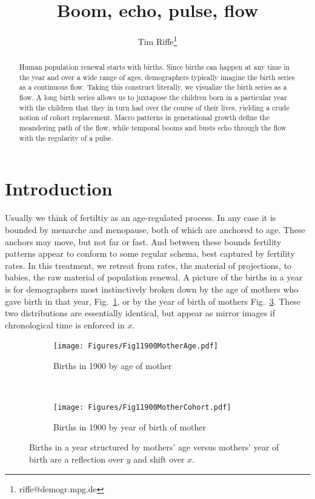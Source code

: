 \documentclass{article}
\begin{document}
\title{Boom, echo, pulse, flow}
\author[1]{Tim Riffe\thanks{riffe@demogr.mpg.de}}
\maketitle

\begin{abstract}
Human population renewal starts with births. Since births can happen at any
time in the year and over a wide range of ages, demographers typically imagine
the birth series as a continuous flow. Taking this construct literally, we
visualize the birth series as a flow. A long birth series allows us to
juxtapose the children born in a particular year with the children that
they in turn had over the course of their lives, yielding a crude notion of
cohort replacement. Macro patterns in generational growth define the meandering
path of the flow, while temporal booms and busts echo through the flow with the
regularity of a pulse.
\end{abstract}

\onehalfspacing
\section{Introduction}
Usually we think of fertiltiy as an age-regulated process. In any case it is
bounded by menarche and menopause, both of which are anchored to age. These anchors may
move, but not far or fast. And between these bounds fertility patterns appear to
conform to some regular schema, best captured by fertility rates. In this treatment, we retreat
from rates, the material of projections, to babies, the raw material of
population renewal. A picture of the births in a year is for demographers most
instinctively broken down by the age of mothers who gave birth in that year,
Fig.~\ref{fig:agemother}, or by the year of birth of mothers Fig.~\ref{fig:cohmother}. These two distributions are essentially identical, but appear as mirror images if chronological time is enforced in $x$.

\begin{figure}[ht!]
\begin{subfigure}[t]{0.5\textwidth}
        \centering
        \texttt{[image: Figures/Fig11900MotherAge.pdf]}
        \caption{Births in 1900 by age of mother}
        \label{fig:agemother}
\end{subfigure}
~
\begin{subfigure}[t]{0.5\textwidth}
        \centering
        \texttt{[image: Figures/Fig11900MotherCohort.pdf]}
        \caption{Births in 1900 by year of birth of mother}
          \label{fig:cohmother}
\end{subfigure}
\caption{Births in a year structured by mothers' age versus mothers' year of birth are a
reflection over $y$ and shift over $x$.}
\end{figure}
\end{document}
